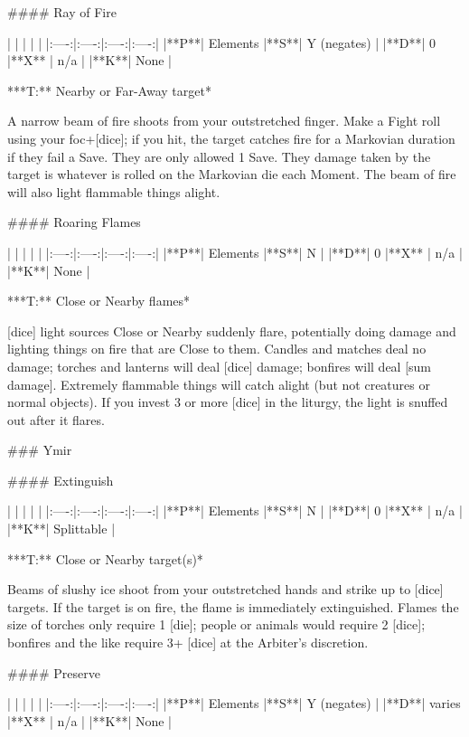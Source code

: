 #### Ray of Fire

| | | | |
|:----:|:----:|:----:|:----:|
|**P**| Elements |**S**|  Y (negates) |
|**D**| 0 |**X** |  n/a  |
|**K**| None |


***T:**   Nearby or Far-Away target*



A narrow beam of fire shoots from your outstretched finger.  Make a Fight roll using your {foc}+[dice]; if you hit, the target catches fire for a Markovian duration if they fail a Save.  They are only allowed 1 Save.  They damage taken by the target is whatever is rolled on the Markovian die each Moment.  The beam of fire will also light flammable things alight.




#### Roaring Flames

| | | | |
|:----:|:----:|:----:|:----:|
|**P**| Elements |**S**|  N |
|**D**| 0 |**X** |  n/a  |
|**K**| None |


***T:**   Close or Nearby flames*



[dice] light sources Close or Nearby suddenly flare, potentially doing damage and lighting things on fire that are Close to them.  Candles and matches deal no damage; torches and lanterns will deal [dice] damage; bonfires will deal [sum damage].  Extremely flammable things will catch alight (but not creatures or normal objects).  If you invest 3 or more [dice] in the liturgy, the light is snuffed out after it flares. 


### Ymir





#### Extinguish

| | | | |
|:----:|:----:|:----:|:----:|
|**P**| Elements |**S**|  N |
|**D**| 0 |**X** |  n/a  |
|**K**| Splittable |

***T:**   Close or Nearby target(s)*



Beams of slushy ice shoot from your outstretched hands and strike up to [dice] targets.  If the target is on fire, the flame is immediately extinguished.  Flames the size of torches only require 1 [die]; people or animals would require 2 [dice]; bonfires and the like require 3+ [dice] at the Arbiter's discretion.






#### Preserve

| | | | |
|:----:|:----:|:----:|:----:|
|**P**| Elements |**S**|  Y (negates) |
|**D**| varies |**X** |  n/a  |
|**K**| None |


